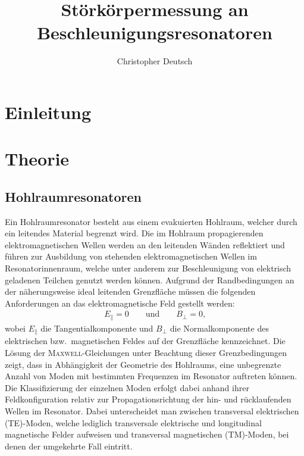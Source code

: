 \documentclass[11pt, a4paper]{scrbook}
\title{Störkörpermessung an Beschleunigungsresonatoren}
\author{Christopher Deutsch}
\begin{document}
	\frontmatter
	\maketitle
	\tableofcontents
	
	\mainmatter
	
	\chapter{Einleitung}
	
	
	\chapter{Theorie}	
	\section{Hohlraumresonatoren}
	Ein Hohlraumresonator besteht aus einem evakuierten Hohlraum, welcher durch ein leitendes Material begrenzt wird.
	Die im Hohlraum propagierenden elektromagnetischen Wellen werden an den leitenden Wänden reflektiert und führen zur Ausbildung von stehenden elektromagnetischen Wellen im Resonatorinnenraum, welche unter anderem zur Beschleunigung von elektrisch geladenen Teilchen genutzt werden können.
	Aufgrund der Randbedingungen an der näherungsweise ideal leitenden Grenzfläche müssen die folgenden Anforderungen an das elektromagnetische Feld gestellt werden:
	\begin{align}
		E_\parallel = 0 \qquad \text{und} \qquad B_\perp = 0\text{,}
		\label{eq:randbedingung_leiter}
	\end{align}
	wobei $E_\parallel$ die Tangentialkomponente und $B_\perp$ die Normalkomponente des elektrischen bzw.\ magnetischen Feldes auf der Grenzfläche kennzeichnet.
	Die Lösung der \textsc{Maxwell}-Gleichungen unter Beachtung dieser Grenzbedingungen zeigt, dass in Abhängigkeit der Geometrie des Hohlraums, eine unbegrenzte Anzahl von Moden mit bestimmten Frequenzen im Resonator auftreten können.
	Die Klassifizierung der einzelnen Moden erfolgt dabei anhand ihrer Feldkonfiguration relativ zur Propagationsrichtung der hin- und rücklaufenden Wellen im Resonator.
	Dabei unterscheidet man zwischen transversal elektrischen (TE)-Moden, welche lediglich transversale elektrische und longitudinal magnetische Felder aufweisen und transversal magnetischen (TM)-Moden, bei denen der umgekehrte Fall eintritt.
	
\end{document}

